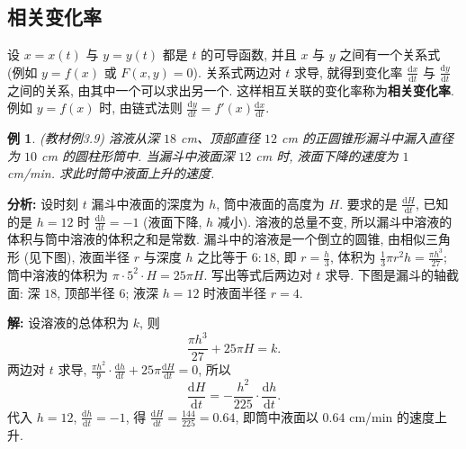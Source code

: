 \documentclass[UTF8,openany]{ctexbook}
\theoremstyle{chinesetextbook}
\newtheorem{example}{例}[section]
\newenvironment{cnsolution}{\par\indent\textbf{解:} \ignorespaces}{\par}
\newcommand{\dd}{\mathrm d}
\begin{document}
\subsection{相关变化率}
设 $x=x(t)$ 与 $y=y(t)$ 都是 $t$ 的可导函数, 并且 $x$ 与 $y$ 之间有一个关系式 (例如 $y=f(x)$ 或 $F(x,y)=0$). 关系式两边对 $t$ 求导, 就得到变化率 $\displaystyle\frac{\dd x}{\dd t}$ 与 $\displaystyle\frac{\dd y}{\dd t}$ 之间的关系, 由其中一个可以求出另一个. 这样相互关联的变化率称为\textbf{相关变化率}. 例如 $y=f(x)$ 时, 由链式法则 $\displaystyle\frac{\dd y}{\dd t}=f'(x)\frac{\dd x}{\dd t}$.
\begin{example}\label{ex:c2-3-9}
\textnormal{(教材例3.9)} 溶液从深 $18$ cm、顶部直径 $12$ cm 的正圆锥形漏斗中漏入直径为 $10$ cm 的圆柱形筒中. 当漏斗中液面深 $12$ cm 时, 液面下降的速度为 $1$ cm/min. 求此时筒中液面上升的速度.
\end{example}
\par\indent\textbf{分析:} 设时刻 $t$ 漏斗中液面的深度为 $h$, 筒中液面的高度为 $H$. 要求的是 $\displaystyle\frac{\dd H}{\dd t}$, 已知的是 $h=12$ 时 $\displaystyle\frac{\dd h}{\dd t}=-1$ (液面下降, $h$ 减小). 溶液的总量不变, 所以漏斗中溶液的体积与筒中溶液的体积之和是常数. 漏斗中的溶液是一个倒立的圆锥, 由相似三角形 (见下图), 液面半径 $r$ 与深度 $h$ 之比等于 $6:18$, 即 $\displaystyle r=\frac h3$, 体积为 $\displaystyle\frac13\pi r^2h=\frac{\pi h^3}{27}$; 筒中溶液的体积为 $\pi\cdot5^2\cdot H=25\pi H$. 写出等式后两边对 $t$ 求导. 下图是漏斗的轴截面: 深 $18$, 顶部半径 $6$; 液深 $h=12$ 时液面半径 $r=4$.
\begin{center}
\end{center}
\begin{cnsolution}
设溶液的总体积为 $k$, 则
\[
\frac{\pi h^3}{27}+25\pi H=k.
\]
两边对 $t$ 求导, $\displaystyle\frac{\pi h^2}9\cdot\frac{\dd h}{\dd t}+25\pi\frac{\dd H}{\dd t}=0$, 所以
\[
\frac{\dd H}{\dd t}=-\frac{h^2}{225}\cdot\frac{\dd h}{\dd t}.
\]
代入 $h=12$, $\displaystyle\frac{\dd h}{\dd t}=-1$, 得 $\displaystyle\frac{\dd H}{\dd t}=\frac{144}{225}=0.64$, 即筒中液面以 $0.64$ cm/min 的速度上升.
\end{cnsolution}
\end{document}
